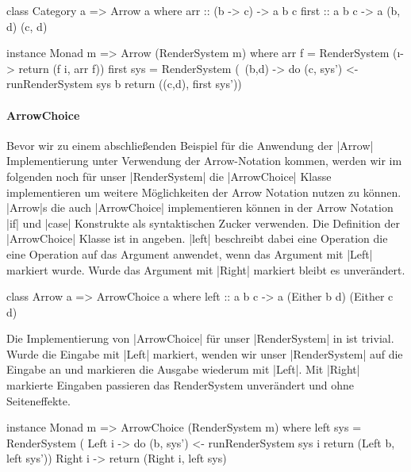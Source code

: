 \begin{haskell}[label={lst:class-arrow},caption={Arrow Klasse\protect\footnotemark},nolol]
class Category a => Arrow a where
  arr :: (b -> c) -> a b c
  first :: a b c -> a (b, d) (c, d)
\end{haskell}


\begin{haskell}[label={lst:rendersystem-arrow},caption={Arrow Instanz für RenderSystem}]
instance Monad m => Arrow (RenderSystem m) where
  arr f = RenderSystem (\i -> return (f i, arr f))
  first sys = RenderSystem (\ (b,d) -> do
    (c, sys') <- runRenderSystem sys b
    return ((c,d), first sys'))
\end{haskell}


\paragraph{ArrowChoice}

Bevor wir zu einem abschließenden Beispiel für die Anwendung der |Arrow| Implementierung unter Verwendung der Arrow-Notation \footnotemark kommen, werden wir im folgenden noch für unser |RenderSystem| die |ArrowChoice| Klasse implementieren um weitere Möglichkeiten der Arrow Notation nutzen zu können. |Arrow|s die auch |ArrowChoice| implementieren können in der Arrow Notation |if| und |case| Konstrukte als syntaktischen Zucker verwenden. Die Definition der |ArrowChoice| Klasse ist in  angeben. |left| beschreibt dabei eine Operation die eine Operation auf das Argument anwendet, wenn das Argument mit |Left| markiert wurde. Wurde das Argument mit |Right| markiert bleibt es unverändert.


\begin{haskell}[label={lst:class-arrowchoice},caption={ArrowChoice Klasse\protect\footnotemark},nolol]
class Arrow a => ArrowChoice a where
  left :: a b c -> a (Either b d) (Either c d)
\end{haskell}

Die Implementierung von |ArrowChoice| für unser |RenderSystem| in  ist trivial. Wurde die Eingabe mit |Left| markiert, wenden wir unser |RenderSystem| auf die Eingabe an und markieren die Ausgabe wiederum mit |Left|. Mit |Right| markierte Eingaben passieren das RenderSystem unverändert und ohne Seiteneffekte.

\begin{haskell}[label={lst:rendersystem-arrowchoice},caption={ArrowChoice Instanz für RenderSystem}]
instance Monad m => ArrowChoice (RenderSystem m) where
  left sys = RenderSystem (\case
    Left i  -> do
      (b, sys') <- runRenderSystem sys i
      return (Left b, left sys'))
    Right i -> return (Right i, left sys)
\end{haskell}
